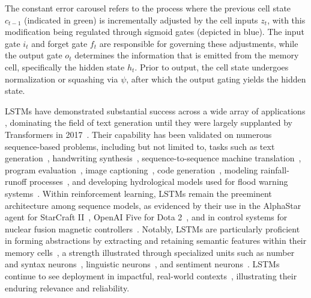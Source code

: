 The constant error carousel refers to the process where the previous cell state $c_{t-1}$ (indicated in green) is incrementally adjusted by the cell inputs $z_t$, with this modification being regulated through sigmoid gates (depicted in blue). The input gate $i_t$ and forget gate $f_t$ are responsible for governing these adjustments, while the output gate $o_t$ determines the information that is emitted from the memory cell, specifically the hidden state $h_t$. Prior to output, the cell state undergoes normalization or squashing via $\psi$, after which the output gating yields the hidden state.

LSTMs have demonstrated substantial success across a wide array of applications \citep{Hochreiter:01,Hochreiter:07,Schmidhuber:15}, dominating the field of text generation until they were largely supplanted by Transformers in 2017~\citep{Vaswani:17}. Their capability has been validated on numerous sequence-based problems, including but not limited to, tasks such as text generation~\citep{Graves:13,Karpathy:15blog}, handwriting synthesis~\citep{Graves:13}, sequence-to-sequence machine translation~\citep{Sutskever:14nips}, program evaluation~\citep{Zaremba:14arxiv}, image captioning~\citep{Karpathy:15,Hossain:19}, code generation~\citep{Karpathy:15blog}, modeling rainfall-runoff processes~\citep{Kratzert:18,Kratzert:19}, and developing hydrological models used for flood warning systems~\citep{Nearing:24}. Within reinforcement learning, LSTMs remain the preeminent architecture among sequence models, as evidenced by their use in the AlphaStar agent for StarCraft II~\citep{Vinyals:17short}, OpenAI Five for Dota 2~\citep{OpenAI:19}, and in control systems for nuclear fusion magnetic controllers~\citep{Degrave:22short}. Notably, LSTMs are particularly proficient in forming abstractions by extracting and retaining semantic features within their memory cells~\citep{Karpathy:15blog}, a strength illustrated through specialized units such as number and syntax neurons~\citep{Lakretz:19}, linguistic neurons~\citep{Bau:19}, and sentiment neurons~\citep{Radford:17arxiv}. LSTMs continue to see deployment in impactful, real-world contexts~\citep{Degrave:22short,Nearing:24}, illustrating their enduring relevance and reliability.

